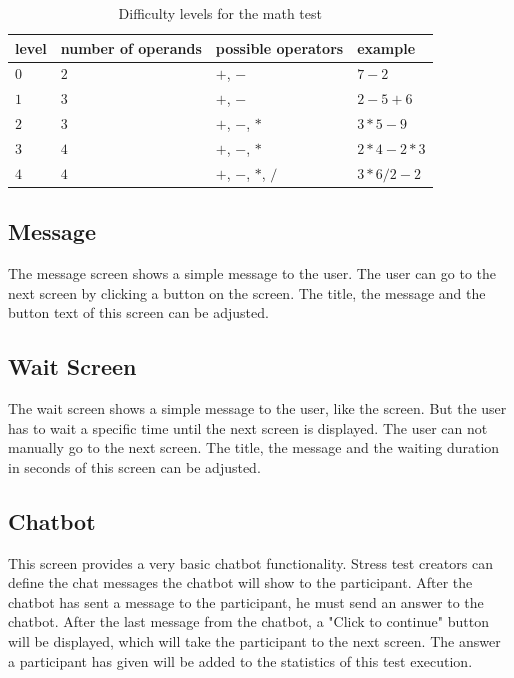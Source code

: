 \begin{table}[ht]
  \begin{tabularx}{\textwidth}{l|l|l|l}
    level & number of operands & possible operators & example \\
    \hline
    $0$ & $2$ & $+$, $-$ & $7-2$ \\
    $1$ & $3$ & $+$, $-$ & $2-5+6$ \\
    $2$ & $3$ & $+$, $-$, $*$ & $3*5-9$ \\
    $3$ & $4$ & $+$, $-$, $*$ & $2*4-2*3$ \\
    $4$ & $4$ & $+$, $-$, $*$, $/$ & $3*6/2-2$ \\
  \end{tabularx}
  \caption{Difficulty levels for the math test}
  \label{tab:math-test-difficulty}
\end{table}

\subsection{Message}
\label{sec:screens-message}
The message screen shows a simple message to the user.
The user can go to the next screen by clicking a button on the screen.
The title, the message and the button text of this screen can be adjusted.

\subsection{Wait Screen}
\label{sec:screens-wait-screen}
The wait screen shows a simple message to the user, like the  screen.
But the user has to wait a specific time until the next screen is displayed.
The user can not manually go to the next screen.
The title, the message and the waiting duration in seconds of this screen can be adjusted.

\subsection{Chatbot}
\label{sec:screens-chatbot}
This screen provides a very basic chatbot functionality.
Stress test creators can define the chat messages the chatbot will show to the participant.
After the chatbot has sent a message to the participant, he must send an answer to the chatbot.
After the last message from the chatbot, a "Click to continue" button will be displayed, which will take the participant to the next screen.
The answer a participant has given will be added to the statistics of this test execution.

